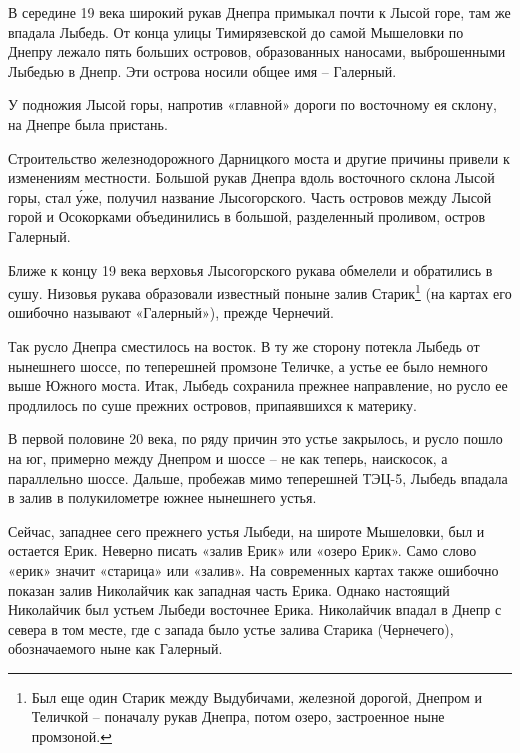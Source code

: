В середине 19 века широкий рукав Днепра примыкал почти к Лысой горе, там же впадала Лыбедь. От конца улицы Тимирязевской до самой Мышеловки по Днепру лежало пять больших островов, образованных наносами, выброшенными Лыбедью в Днепр. Эти острова носили общее имя – Галерный.

У подножия Лысой горы, напротив «главной» дороги по восточному ея склону, на Днепре была пристань.

Строительство железнодорожного Дарницкого моста и другие причины привели к изменениям местности. Большой рукав Днепра вдоль восточного склона Лысой горы, стал \'уже, получил название Лысогорского. Часть островов между Лысой горой и Осокорками объединились в большой, разделенный проливом, остров Галерный.

Ближе к концу 19 века верховья Лысогорского рукава обмелели и обратились в сушу. Низовья рукава образовали известный поныне залив Старик\footnote{Был еще один Старик между Выдубичами, железной дорогой, Днепром и Теличкой – поначалу рукав Днепра, потом озеро, застроенное ныне промзоной.} (на картах его ошибочно называют «Галерный»), прежде Чернечий. 

Так русло Днепра сместилось на восток. В ту же сторону потекла Лыбедь от нынешнего шоссе, по теперешней промзоне Теличке, а устье ее было немного выше Южного моста. Итак, Лыбедь сохранила прежнее направление, но русло ее продлилось по суше прежних островов, припаявшихся к материку.


В первой половине 20 века, по ряду причин это устье закрылось, и русло пошло на юг, примерно между Днепром и шоссе – не как теперь, наискосок, а параллельно шоссе. Дальше, пробежав мимо теперешней ТЭЦ-5, Лыбедь впадала в залив в полукилометре южнее нынешнего устья.

Сейчас, западнее сего прежнего устья Лыбеди, на широте Мышеловки, был и остается Ерик. Неверно писать «залив Ерик» или «озеро Ерик». Само слово «ерик» значит «старица» или «залив». На современных картах также ошибочно показан залив Николайчик как западная часть Ерика. Однако настоящий Николайчик был устьем Лыбеди восточнее Ерика. Николайчик впадал в Днепр с севера в том месте, где с запада было устье залива Старика (Чернечего), обозначаемого ныне как Галерный.

